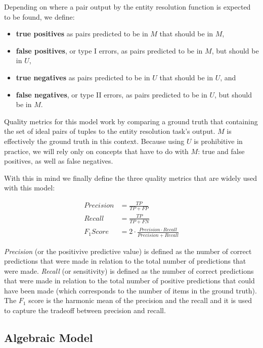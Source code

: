 \documentclass[11pt]{article}
\begin{document}
    Depending on where a pair output by the entity resolution function is
    expected to be found, we define:

    \begin{itemize}
        \item \textbf{true positives} as pairs predicted to be in $M$ that
        should be in $M$,
        \item \textbf{false positives}, or type I errors, as pairs predicted to
        be in $M$, but should be in $U$,
        \item \textbf{true negatives} as pairs predicted to be in $U$ that
        should be in $U$, and
        \item \textbf{false negatives}, or type II errors, as pairs predicted to
        be in $U$, but should be in $M$.
    \end{itemize}

    Quality metrics for this model work by comparing a ground truth that
    containing the set of ideal pairs of tuples to the entity resolution task's
    output.
    $M$ is effectively the ground truth in this context.
    Because using $U$ is prohibitive in practice, we will rely only on concepts
    that have to do with $M$: true and false positives, as well as false
    negatives.

    With this in mind we finally define the three quality metrics that are
    widely used with this model:

    \begin{align}
    Precision&=\frac{TP}{TP+FP} \\
    Recall&=\frac{TP}{TP+FN} \\
    F_1 Score&=2 \cdot \frac{Precision \cdot Recall}{Precision+Recall}
    \end{align}

    \textit{Precision} (or the positivive predictive value) is defined as the
    number of correct predictions that were made in relation to the total number
    of predictions that were made.
    \textit{Recall} (or sensitivity) is defined as the number of correct
    predictions that were made in relation to the total number of positive
    predictions that could have been made (which corresponds to the number of
    items in the ground truth).
    The \textit{$F_1$} score is the harmonic mean of the precision and the
    recall and it is used to capture the tradeoff between precision and
    recall\cite{hitesh2012}.

    \subsection[algebraic]{Algebraic Model}\label{subsec:algebraic}
\end{document}
